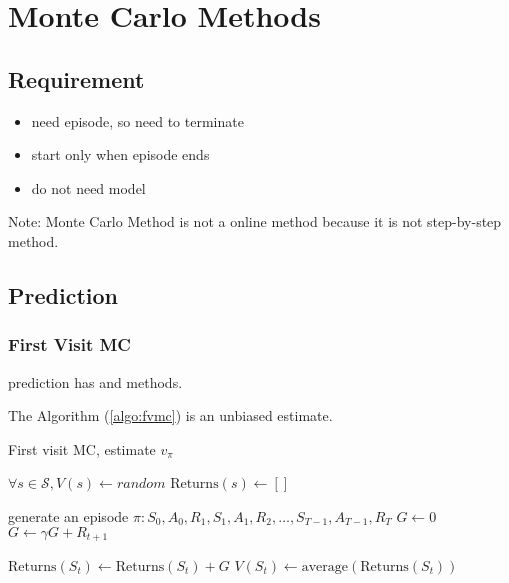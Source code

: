 

\section{Monte Carlo Methods}

\subsection{Requirement}

\begin{itemize}
	\item need episode, so need to terminate
	\item start only when episode ends
	\item do not need model
\end{itemize}

Note: Monte Carlo Method is not a online method because it is not step-by-step method.

\subsection{Prediction}

\subsubsection{First Visit MC}

 prediction has  and  methods.


The  Algorithm (\ref{algo:fvmc}) is an unbiased estimate. 



\begin{algorithm}
	\caption{First visit MC, estimate $v_\pi$}\label{algo:fvmc}
	
	\begin{algorithmic}[1]
		\State $\forall s \in \mathcal{S}, V(s) \gets random$
		\State $\text{Returns}(s) \gets []$
		
		\Statex
		
		\Loop
			\State generate an episode $\pi: S_0, A_0, R_1, S_1, A_1, R_2, \dots, S_{T-1}, A_{T-1}, R_T$
			\State $G \gets 0$
				\State $G \gets \gamma G + R_{t+1}$
				
					\State $\text{Returns}(S_t) \gets \text{Returns}(S_t) + G$
					\State $V(S_t) \gets \text{average}(\text{Returns}(S_t))$
				\EndIf
			\EndFor
		\EndLoop
	\end{algorithmic}
\end{algorithm}

